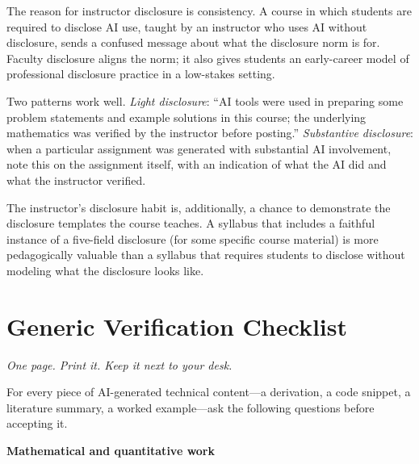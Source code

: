 \documentclass[11pt]{book}
\begin{document}
The reason for instructor disclosure is consistency. A course in which students are required to disclose AI use, taught by an instructor who uses AI without disclosure, sends a confused message about what the disclosure norm is for. Faculty disclosure aligns the norm; it also gives students an early-career model of professional disclosure practice in a low-stakes setting.

Two patterns work well. \emph{Light disclosure}: ``AI tools were used in preparing some problem statements and example solutions in this course; the underlying mathematics was verified by the instructor before posting.'' \emph{Substantive disclosure}: when a particular assignment was generated with substantial AI involvement, note this on the assignment itself, with an indication of what the AI did and what the instructor verified.

The instructor's disclosure habit is, additionally, a chance to demonstrate the disclosure templates the course teaches. A syllabus that includes a faithful instance of a five-field disclosure (for some specific course material) is more pedagogically valuable than a syllabus that requires students to disclose without modeling what the disclosure looks like.



\appendix

\chapter{Generic Verification Checklist}
\label{app:verification-checklist}

\noindent \emph{One page. Print it. Keep it next to your desk.}

\medskip

For every piece of AI-generated technical content---a derivation, a code snippet, a literature summary, a worked example---ask the following questions before accepting it.

\medskip

\noindent \textbf{Mathematical and quantitative work}
\end{document}
